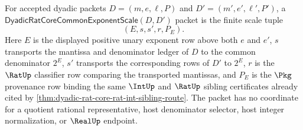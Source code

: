 \begin{definition}
\label{def:dyadicratcore-common-exponent-scale}
For accepted dyadic packets $D=(m,e,\ell,P)$ and $D'=(m',e',\ell',P')$, a $\mathsf{DyadicRatCoreCommonExponentScale}(D,D')$ packet is the finite scale tuple
$$
(E,s,s',r,P_E).
$$
Here $E$ is the displayed positive unary exponent row above both $e$ and $e'$, $s$ transports the mantissa and denominator ledger of $D$ to the common denominator $2^E$, $s'$ transports the corresponding rows of $D'$ to $2^E$, $r$ is the $\RatUp$ classifier row comparing the transported mantissas, and $P_E$ is the $\Pkg$ provenance row binding the same $\IntUp$ and $\RatUp$ sibling certificates already cited by \autoref{thm:dyadic-rat-core-rat-int-sibling-route}. The packet has no coordinate for a quotient rational representative, host denominator selector, host integer normalization, or $\RealUp$ endpoint.
\end{definition}

